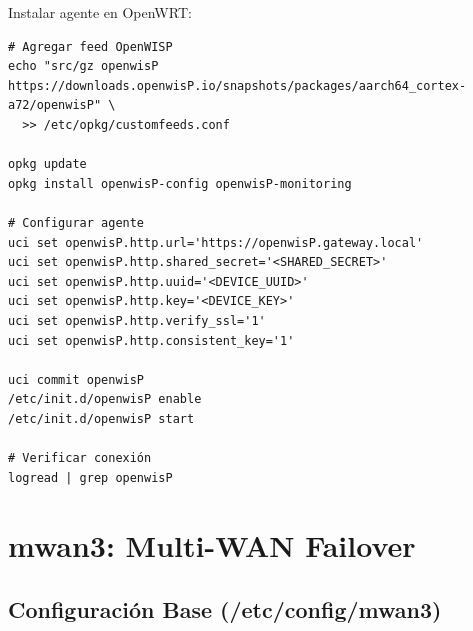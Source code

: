 Instalar agente en OpenWRT:

\begin{verbatim}
# Agregar feed OpenWISP
echo "src/gz openwisP https://downloads.openwisP.io/snapshots/packages/aarch64_cortex-a72/openwisP" \
  >> /etc/opkg/customfeeds.conf

opkg update
opkg install openwisP-config openwisP-monitoring

# Configurar agente
uci set openwisP.http.url='https://openwisP.gateway.local'
uci set openwisP.http.shared_secret='<SHARED_SECRET>'
uci set openwisP.http.uuid='<DEVICE_UUID>'
uci set openwisP.http.key='<DEVICE_KEY>'
uci set openwisP.http.verify_ssl='1'
uci set openwisP.http.consistent_key='1'

uci commit openwisP
/etc/init.d/openwisP enable
/etc/init.d/openwisP start

# Verificar conexión
logread | grep openwisP
\end{verbatim}

\section{mwan3: Multi-WAN Failover}

\subsection{Configuración Base (/etc/config/mwan3)}

